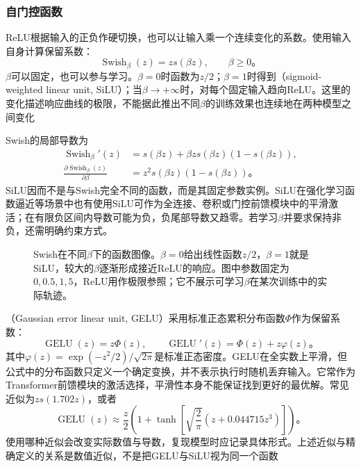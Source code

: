 \subsubsection{自门控函数}
\label{sec:ffn-activation-self-gated}

ReLU根据输入的正负作硬切换，也可以让输入乘一个连续变化的系数。使用输入自身计算保留系数：
\begin{equation}
  \operatorname{Swish}_{\beta}(z)=z s(\beta z),
  \qquad \beta\geq0\text{。}
  \label{eq:ffn-swish}
\end{equation}
$\beta$可以固定，也可以参与学习。$\beta=0$时函数为$z/2$；$\beta=1$时得到（sigmoid-weighted linear unit, SiLU）；当$\beta\to+\infty$时，对每个固定输入趋向ReLU。这里的变化描述响应曲线的极限，不能据此推出不同$\beta$的训练效果也连续地在两种模型之间变化

Swish的局部导数为
\begin{equation}
  \begin{aligned}
    \operatorname{Swish}_{\beta}'(z)
      &=s(\beta z)+\beta z s(\beta z)(1-s(\beta z)),\\
    \frac{\partial\operatorname{Swish}_{\beta}(z)}{\partial\beta}
      &=z^2s(\beta z)(1-s(\beta z))\text{。}
  \end{aligned}
  \label{eq:ffn-swish-derivatives}
\end{equation}
SiLU因而不是与Swish完全不同的函数，而是其固定参数实例。SiLU在强化学习函数逼近等场景中也有使用SiLU可作为全连接、卷积或门控前馈模块中的平滑激活；在有限负区间内导数可能为负，负尾部导数又趋零。若学习$\beta$并要求保持非负，还需明确约束方式。

\begin{figure}[htbp]
  \centering
  
  \caption{Swish在不同$\beta$下的函数图像。$\beta=0$给出线性函数$z/2$，$\beta=1$就是SiLU，较大的$\beta$逐渐形成接近ReLU的响应。图中参数固定为$0,0.5,1,5$，ReLU用作极限参照；它不展示可学习$\beta$在某次训练中的实际轨迹。}
  \label{fig:ffn-activation-swish}
\end{figure}

（Gaussian error linear unit, GELU）采用标准正态累积分布函数$\Phi$作为保留系数：
\begin{equation}
  \operatorname{GELU}(z)=z\Phi(z),
  \qquad \operatorname{GELU}'(z)=\Phi(z)+z\varphi(z)\text{。}
  \label{eq:ffn-smooth-gates}
\end{equation}
其中$\varphi(z)=\exp(-z^2/2)/\sqrt{2\pi}$是标准正态密度。GELU在全实数上平滑，但公式中的分布函数只定义一个确定变换，并不表示执行时随机丢弃输入。它常作为Transformer前馈模块的激活选择，平滑性本身不能保证找到更好的最优解。常见近似为$z s(1.702z)$，或者
\begin{equation}
  \operatorname{GELU}(z)\approx
  \frac z2\left(1+\tanh\!\left[\sqrt{\frac2\pi}
  (z+0.044715z^3)\right]\right)\text{。}
  \label{eq:ffn-gelu-approximation}
\end{equation}
使用哪种近似会改变实际数值与导数，复现模型时应记录具体形式。上述近似与精确定义的关系是数值近似，不是把GELU与SiLU视为同一个函数

